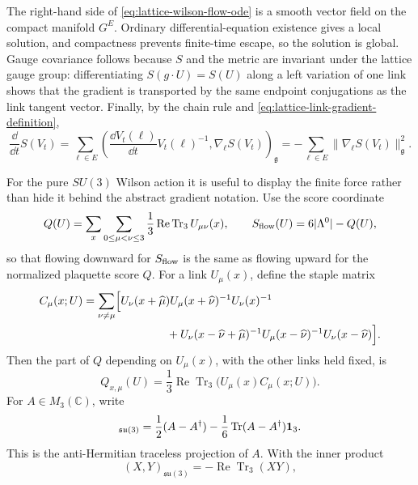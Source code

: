 The right-hand side of \eqref{eq:lattice-wilson-flow-ode} is a smooth vector
field on the compact manifold \(G^E\).  Ordinary differential-equation
existence gives a local solution, and compactness prevents finite-time escape,
so the solution is global.  Gauge covariance follows because \(S\) and the
metric are invariant under the lattice gauge group: differentiating
\(S(g\cdot U)=S(U)\) along a left variation of one link shows that the gradient
is transported by the same endpoint conjugations as the link tangent vector.
Finally, by the chain rule and
\eqref{eq:lattice-link-gradient-definition},
\[
  \frac{\dd}{\dd t}S(V_t)
  =
  \sum_{\ell\in E}
  \left(
  \frac{\dd V_t(\ell)}{\dd t}V_t(\ell)^{-1},
  \nabla_\ell S(V_t)
  \right)_{\mathfrak g}
  =
  -\sum_{\ell\in E}\|\nabla_\ell S(V_t)\|_{\mathfrak g}^2 .
\]

For the pure \(SU(3)\) Wilson action it is useful to display the finite
force rather than hide it behind the abstract gradient notation.  Use the
score coordinate
\begin{equation}
  Q(U)=
  \sum_{x}\sum_{0\le\mu<\nu\le3}
  \frac13\operatorname{Re}\operatorname{Tr}_{3}U_{\mu\nu}(x),
  \qquad
  S_{\rm flow}(U)=6|\Lambda^0|-Q(U),
  \label{eq:su3-wilson-flow-score}
\end{equation}
so that flowing downward for \(S_{\rm flow}\) is the same as flowing upward
for the normalized plaquette score \(Q\).  For a link \(U_\mu(x)\), define
the staple matrix
\begin{align}
  C_\mu(x;U)
  &=
  \sum_{\nu\ne\mu}
  \Bigl[
  U_\nu(x+\widehat\mu)
  U_\mu(x+\widehat\nu)^{-1}
  U_\nu(x)^{-1}
  \notag\\
  &\hspace{2.6cm}
  +
  U_\nu(x-\widehat\nu+\widehat\mu)^{-1}
  U_\mu(x-\widehat\nu)^{-1}
  U_\nu(x-\widehat\nu)
  \Bigr].
  \label{eq:su3-wilson-flow-staple}
\end{align}
Then the part of \(Q\) depending on \(U_\mu(x)\), with the other links held
fixed, is
\[
  Q_{x,\mu}(U)=
  \frac13\operatorname{Re}\operatorname{Tr}_{3}
  \bigl(U_\mu(x)C_\mu(x;U)\bigr).
\]
For \(A\in M_3(\mathbb C)\), write
\begin{equation}
  [A]_{\mathfrak{su}(3)}
  =
  \frac12(A-A^\dagger)
  -
  \frac16\operatorname{Tr}(A-A^\dagger){\bf1}_3 .
  \label{eq:su3-antihermitian-traceless-projection}
\end{equation}
This is the anti-Hermitian traceless projection of \(A\).  With the
inner product
\[
  (X,Y)_{\mathfrak{su}(3)}=-\operatorname{Re}\operatorname{Tr}_3(XY),
\]
